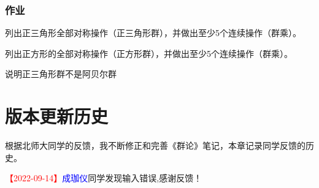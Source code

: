 \documentclass[math=mtpro2,lang=cn,color=green]{elegantbook}
\begin{document}
\subsection{作业}
\begin{exercise}
   列出正三角形全部对称操作（正三角形群），并做出至少5个连续操作（群乘）。
\end{exercise}
\begin{exercise}
   列出正方形的全部对称操作（正方形群），并做出至少5个连续操作（群乘）。
\end{exercise}
\begin{exercise}
   说明正三角形群不是阿贝尔群
\end{exercise}


\chapter{版本更新历史}

根据北师大同学的反馈，我不断修正和完善《群论》笔记，本章记录同学反馈的历史。

\newcommand{\fankui}[3]{
   \textcolor{red}{【#1】}\textcolor{blue}{#2}同学#3,感谢反馈！
}


\fankui{2022-09-14}{成珈仪}{发现输入错误}
\end{document}
